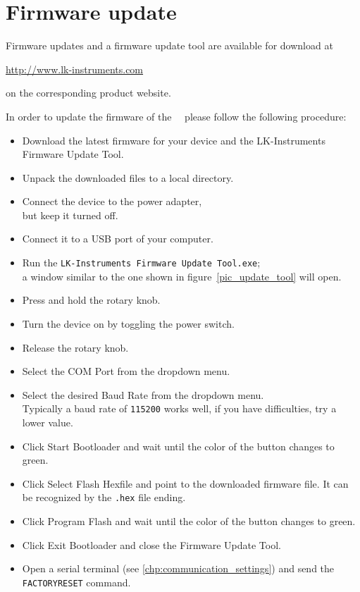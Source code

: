 
\section{Firmware update}
\label{firmware_update}
Firmware updates and a firmware update tool are available for download at
\begin{center}
  \url{http://www.lk-instruments.com}
\end{center}
on the corresponding product website.

In order to update the firmware of the \productNumber ~\productName ~please follow the following procedure:
\begin{itemize}
\item Download the latest firmware for your device and the LK-Instruments Firmware Update Tool.
\item Unpack the downloaded files to a local directory.
\item Connect the device to the power adapter,\\
      but keep it turned off.
\item Connect it to a USB port of your computer.
\item Run the \texttt{LK-Instruments Firmware Update Tool.exe};\\
      a window similar to the one shown in figure~\ref{pic_update_tool} will open.
\item Press and hold the rotary knob.
\item Turn the device on by toggling the power switch.
\item Release the rotary knob.
\item Select the \textsf{COM Port} from the dropdown menu.
\item Select the desired \textsf{Baud Rate} from the dropdown menu.\\
      Typically a baud rate of \texttt{115200} works well, if you have difficulties, try a lower value.
\item Click \textsf{Start Bootloader} and wait until the color of the button changes to green.
\item Click \textsf{Select Flash Hexfile} and point to the downloaded firmware file. It can be recognized by the \texttt{.hex} file ending.
\item Click \textsf{Program Flash} and wait until the color of the button changes to green.
\item Click \textsf{Exit Bootloader} and close the Firmware Update Tool.
\item Open a serial terminal (see \ref{chp:communication_settings}) and send the \texttt{FACTORYRESET} command.


\end{itemize}


